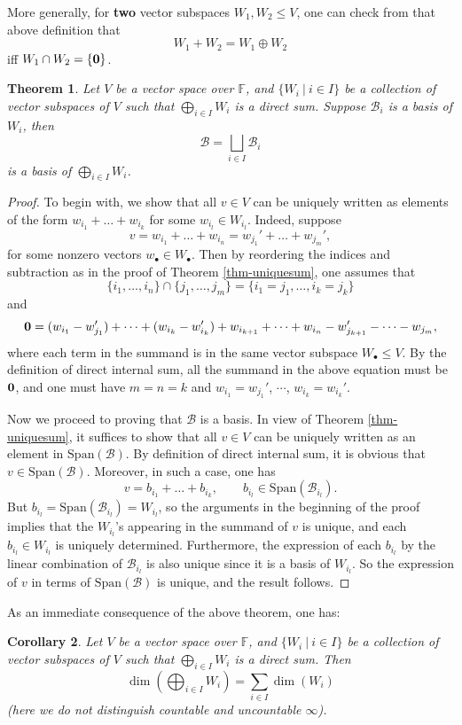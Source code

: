 \documentclass[12pt]{amsbook}
\newtheorem{theorem}{Theorem}[section]
\newtheorem{corollary}[theorem]{Corollary}
\begin{document}
\smallskip
More generally, for {\bf two} vector subspaces $W_1, W_2 \leq V$, one can check from that above definition that
$$W_1 + W_2 = W_1 \oplus W_2$$
iff $W_1 \cap W_2 = \{\bf 0\}$. 
\begin{theorem}
    Let $V$ be a vector space over $\mathbb{F}$, and $\{W_i\ |\ i \in I\}$ be a collection of vector subspaces of $V$ such that
    $\bigoplus_{i \in I} W_i$ is a direct sum. Suppose $\mathcal{B}_i$ is a basis of $W_i$, then $$\mathcal{B} = \bigsqcup_{i\in I} \mathcal{B}_i$$ is a basis of $\bigoplus_{i \in I} W_i$.
\end{theorem}
\begin{proof}
To begin with, we show that all $v \in V$ can be uniquely written as elements of the form $w_{i_1} + \dots + w_{i_k}$ for some $w_{i_l} \in W_{i_l}$. Indeed, suppose 
$$v = w_{i_1} + \dots + w_{i_n} = w_{j_1}' + \dots + w_{j_m}',$$
for some nonzero vectors $w_{\bullet} \in W_{\bullet}$. Then by reordering the indices and subtraction as in the proof of Theorem \ref{thm-uniquesum}, one assumes 
that 
$$\{i_1, \dots, i_n\} \cap \{j_1, \dots, j_m\} = \{i_1 = j_1, \dots, i_k = j_k\}$$ 
and
$${\bf 0} = (w_{i_1}-w_{j_1}') + \dots + (w_{i_k}-w_{i_k}') + w_{i_{k+1}} + \dots + w_{i_n} - w_{j_{k+1}}' - \dots - w_{j_m},$$
where each term in the summand is in the same vector subspace $W_{\bullet} \leq V$. By the definition of direct internal sum, all the summand in the above equation must be ${\bf 0}$, and one must have
$m = n = k$ and $w_{i_1} = w_{j_1}'$, $\cdots$, $w_{i_k} = w_{i_k}'$.

Now we proceed to proving that $\mathcal{B}$ is a basis. In view of Theorem \ref{thm-uniquesum}, it suffices to show that all $v \in V $ can be uniquely written as an element in $\mathrm{Span}(\mathcal{B})$. By definition of direct internal sum, it is obvious that $v \in \mathrm{Span}(\mathcal{B})$. Moreover, in such a case, one has
$$v = b_{i_1} + \dots + b_{i_k}, \quad \quad b_{i_l} \in \mathrm{Span}(\mathcal{B}_{i_l}).$$
But $b_{i_l} = \mathrm{Span}(\mathcal{B}_{i_l}) = W_{i_l}$, so the arguments in the beginning of the proof implies that the $W_{i_l}$'s appearing in the summand of $v$ is unique, and each $b_{i_l} \in W_{i_l}$ is uniquely determined. Furthermore, the expression of each $b_{i_l}$ by the linear combination of $\mathcal{B}_{i_l}$ is also unique since it is a basis of $W_{i_l}$. So the expression of $v$ in terms of $\mathrm{Span}(\mathcal{B})$ is unique, and the result follows.
\end{proof}

As an immediate consequence of the above theorem, one has:
\begin{corollary}
 Let $V$ be a vector space over $\mathbb{F}$, and $\{W_i\ |\ i \in I\}$ be a collection of vector subspaces of $V$ such that $\bigoplus_{i \in I} W_i$ is a direct sum. Then
    $$\dim\left(\bigoplus_{i \in I} W_i\right) = \sum_{i \in I} \dim(W_i)$$
    (here we do not distinguish countable and uncountable $\infty$).
\end{corollary}
\end{document}
